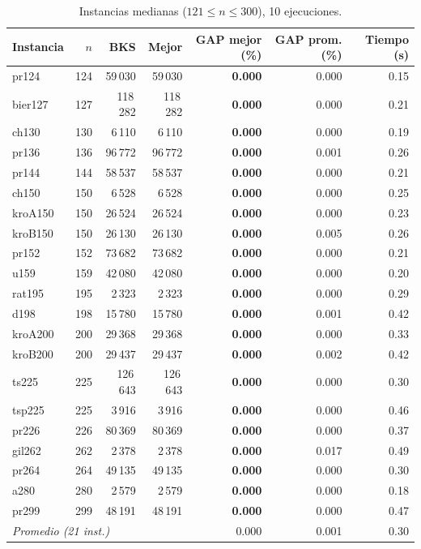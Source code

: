 \documentclass[runningheads]{llncs}
\begin{document}
\begin{table}
\caption{Instancias medianas ($121\le n\le 300$), 10 ejecuciones.}
\label{tab:medium}
\centering\scriptsize
\begin{tabular}{@{}lrrrrrr@{}}
\toprule
\textbf{Instancia} & $n$ & \textbf{BKS} & \textbf{Mejor} & \textbf{GAP mejor (\%)} & \textbf{GAP prom. (\%)} & \textbf{Tiempo (s)}\\
\midrule
pr124 & 124 & 59\,030 & 59\,030 & \textbf{0.000} & 0.000 & 0.15 \\
bier127 & 127 & 118\,282 & 118\,282 & \textbf{0.000} & 0.000 & 0.21 \\
ch130 & 130 & 6\,110 & 6\,110 & \textbf{0.000} & 0.000 & 0.19 \\
pr136 & 136 & 96\,772 & 96\,772 & \textbf{0.000} & 0.001 & 0.26 \\
pr144 & 144 & 58\,537 & 58\,537 & \textbf{0.000} & 0.000 & 0.21 \\
ch150 & 150 & 6\,528 & 6\,528 & \textbf{0.000} & 0.000 & 0.25 \\
kroA150 & 150 & 26\,524 & 26\,524 & \textbf{0.000} & 0.000 & 0.23 \\
kroB150 & 150 & 26\,130 & 26\,130 & \textbf{0.000} & 0.005 & 0.26 \\
pr152 & 152 & 73\,682 & 73\,682 & \textbf{0.000} & 0.000 & 0.21 \\
u159 & 159 & 42\,080 & 42\,080 & \textbf{0.000} & 0.000 & 0.20 \\
rat195 & 195 & 2\,323 & 2\,323 & \textbf{0.000} & 0.000 & 0.29 \\
d198 & 198 & 15\,780 & 15\,780 & \textbf{0.000} & 0.001 & 0.42 \\
kroA200 & 200 & 29\,368 & 29\,368 & \textbf{0.000} & 0.000 & 0.33 \\
kroB200 & 200 & 29\,437 & 29\,437 & \textbf{0.000} & 0.002 & 0.42 \\
ts225 & 225 & 126\,643 & 126\,643 & \textbf{0.000} & 0.000 & 0.30 \\
tsp225 & 225 & 3\,916 & 3\,916 & \textbf{0.000} & 0.000 & 0.46 \\
pr226 & 226 & 80\,369 & 80\,369 & \textbf{0.000} & 0.000 & 0.37 \\
gil262 & 262 & 2\,378 & 2\,378 & \textbf{0.000} & 0.017 & 0.49 \\
pr264 & 264 & 49\,135 & 49\,135 & \textbf{0.000} & 0.000 & 0.30 \\
a280 & 280 & 2\,579 & 2\,579 & \textbf{0.000} & 0.000 & 0.18 \\
pr299 & 299 & 48\,191 & 48\,191 & \textbf{0.000} & 0.000 & 0.47 \\
\midrule
\multicolumn{4}{l}{\textit{Promedio (21 inst.)}} & 0.000 & 0.001 & 0.30 \\
\bottomrule
\end{tabular}
\end{table}
\end{document}
